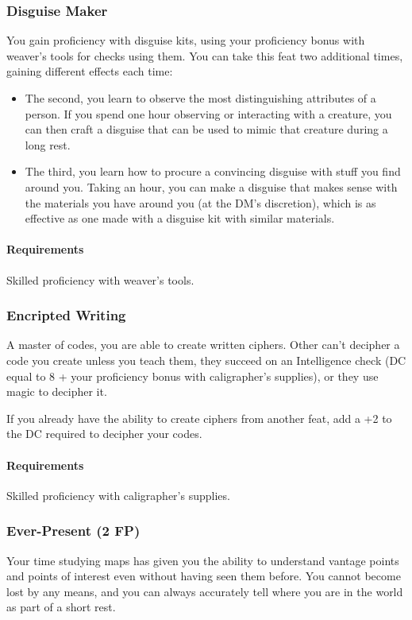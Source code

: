 \subsubsection{Disguise Maker} \label{feat::disguisemaker}
    You gain proficiency with disguise kits, using your proficiency bonus with weaver's tools for checks using them.
    You can take this feat two additional times, gaining different effects each time:
    \begin{itemize}
        \item The second, you learn to observe the most distinguishing attributes of a person.
        If you spend one hour observing or interacting with a creature, you can then craft a disguise that can be used to mimic that creature during a long rest.
        \item The third, you learn how to procure a convincing disguise with stuff you find around you.
        Taking an hour, you can make a disguise that makes sense with the materials you have around you (at the DM's discretion), which is as effective as one made with a disguise kit with similar materials.
    \end{itemize}
    \paragraph{Requirements} Skilled proficiency with weaver's tools.
\subsubsection{Encripted Writing} \label{feat::encriptedwriting}
    A master of codes, you are able to create written ciphers.
    Other can't decipher a code you create unless you teach them, they succeed on an Intelligence check (DC equal to 8 + your proficiency bonus with caligrapher's supplies), or they use magic to decipher it.

    If you already have the ability to create ciphers from another feat, add a +2 to the DC required to decipher your codes.
    \paragraph{Requirements} Skilled proficiency with caligrapher's supplies.
\subsubsection{Ever-Present (2 FP)} \label{feat::everpresent}
    Your time studying maps has given you the ability to understand vantage points and points of interest even without having seen them before.
    You cannot become lost by any means, and you can always accurately tell where you are in the world as part of a short rest.
